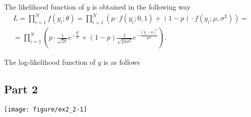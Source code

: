 \documentclass[12pt, a4paper]{article}\usepackage[]{graphicx}\usepackage[]{color}
\makeatletter
\def\maxwidth{ %
  \ifdim\Gin@nat@width>\linewidth
    \linewidth
  \else
    \Gin@nat@width
  \fi
}
\newenvironment{knitrout}{}{} %
\makeatother
\begin{document}
The likelihood function of $y$ is obtained in the following way
\begin{gather*} 
  L = \prod_{i=1}^N f(y_i; \theta) = \prod_{i=1}^N  \left(  p\cdot  f(y_i; 0, 1) + (1-p) \cdot  f(y_i; \mu, \sigma^2) \right) = \\
  = \prod_{i=1}^N \left(  p\cdot  \frac{1}{\sqrt{2\pi}} e^{-\frac{y_i^2}{2}} + (1-p)\frac{1}{\sqrt{2\pi\sigma^2}} e^{-\frac{(y_i-\mu)^2}{2\sigma^2}}  \right).
\end{gather*}


The log-likelihood function of $y$ is as follows


\subsection{Part 2}
\begin{knitrout}
\color{fgcolor}

{\centering \texttt{[image: figure/ex2\_2-1]} 

}



\end{knitrout}
\end{document}
